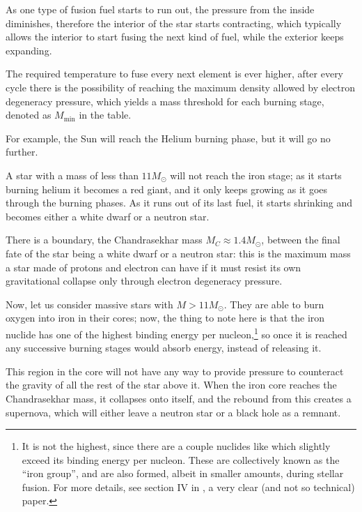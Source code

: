 \documentclass[main.tex]{subfiles}
\begin{document}
As one type of fusion fuel starts to run out, the pressure from the inside diminishes, therefore the interior of the star starts contracting, which typically allows the interior to start fusing the next kind of fuel, while the exterior keeps expanding. 

The required temperature to fuse every next element is ever higher, after every cycle there is the possibility of reaching the maximum density allowed by electron degeneracy pressure, which yields a mass threshold for each burning stage, denoted as \(M _{\text{min}}\) in the table.

For example, the Sun will reach the Helium burning phase, but it will go no further.

A star with a mass of less than \(11 M_{\odot}\) will not reach the iron stage; as it starts burning helium it becomes a red giant, and it only keeps growing as it goes through the burning phases. As it runs out of its last fuel, it starts shrinking and becomes either a white dwarf or a neutron star.

There is a boundary, the Chandrasekhar mass \(M_C \approx \num{1.4} M_{\odot}\), between the final fate of the star being a white dwarf or a neutron star: this is the maximum mass a star made of protons and electron can have if it must resist its own gravitational collapse only through electron degeneracy pressure. 

Now, let us consider massive stars with \(M > 11M _{\odot}\). They are able to burn oxygen into iron in their cores; now, the thing to note here is that the iron nuclide  has one of the highest binding energy per nucleon,\footnote{It is not the highest, since there are a couple nuclides like  which slightly exceed its binding energy per nucleon. These are collectively known as the ``iron group'', and are also formed, albeit in smaller amounts, during stellar fusion. For more details, see section IV in \textcite[]{fewellAtomicNuclideHighest1995}, a very clear (and not so technical) paper.} so once it is reached any successive burning stages would absorb energy, instead of releasing it.

This region in the core will not have any way to provide pressure to counteract the gravity of all the rest of the star above it. 
When the iron core reaches the Chandrasekhar mass, it collapses onto itself, and the rebound from this creates a supernova, which will either leave a neutron star or a black hole as a remnant.
\end{document}
